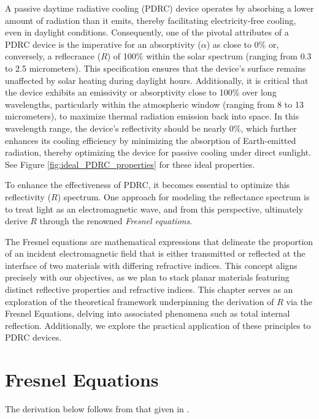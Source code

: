 A passive daytime radiative cooling (PDRC) device operates by absorbing a lower amount of radiation than it emits, thereby facilitating electricity-free cooling, even in daylight conditions. Consequently, one of the pivotal attributes of a PDRC device is the imperative for an absorptivity ($\alpha$) as close to 0\% or, conversely, a reflecrance ($R$) of 100\% within the solar spectrum (ranging from 0.3 to 2.5 micrometers). This specification ensures that the device's surface remains unaffected by solar heating during daylight hours. Additionally, it is critical that the device exhibits an emissivity or absorptivity close to 100\% over long wavelengths, particularly within the atmospheric window (ranging from 8 to 13 micrometers), to maximize thermal radiation emission back into space. In this wavelength range, the device's reflectivity should be nearly 0\%, which further enhances its cooling efficiency by minimizing the absorption of Earth-emitted radiation, thereby optimizing the device for passive cooling under direct sunlight. See Figure \ref{fig:ideal_PDRC_properties} for these ideal properties.

To enhance the effectiveness of PDRC, it becomes essential to optimize this reflectivity ($R$) spectrum. One approach for modeling the reflectance spectrum is to treat light as an electromagnetic wave, and from this perspective, ultimately derive $R$ through the renowned \textit{Fresnel equations}.

The Fresnel equations are mathematical expressions that delineate the proportion of an incident electromagnetic field that is either transmitted or reflected at the interface of two materials with differing refractive indices. This concept aligns precisely with our objectives, as we plan to stack planar materials featuring distinct reflective properties and refractive indices. This chapter serves as an exploration of the theoretical framework underpinning the derivation of $R$ via the Fresnel Equations, delving into associated phenomena such as total internal reflection. Additionally, we explore the practical application of these principles to PDRC devices.


\section{Fresnel Equations}
The derivation below follows from that given in \cite{pedrotti_introduction_2007}.

